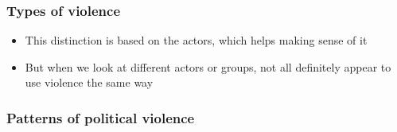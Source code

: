 \documentclass[utf8, xcolor=dvipsnames, handout]{beamer}
\begin{document}
\begin{frame}
\frametitle{Types of violence}
\centering

\begin{itemize}[<+->]
  \item This distinction is based on the actors, which helps making sense of it
  \item But when we look at different actors or groups, not all definitely appear to use violence the same way
\end{itemize}


\end{frame}

\begin{frame}
\frametitle{Patterns of political violence}
\centering



\end{frame}
\end{document}
